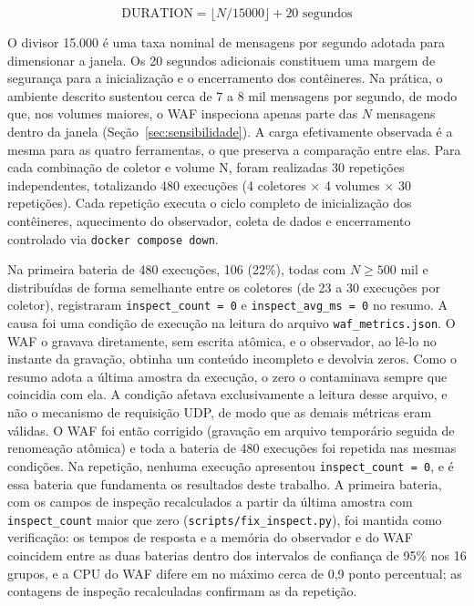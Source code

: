 \begin{equation}
\text{DURATION} = \lfloor N / 15000 \rfloor + 20 \text{ segundos}
\label{eq:duration}
\end{equation}

O divisor 15.000 é uma taxa nominal de mensagens por segundo adotada para dimensionar a janela. Os 20 segundos adicionais constituem uma margem de segurança para a inicialização e o encerramento dos contêineres. Na prática, o ambiente descrito sustentou cerca de 7 a 8 mil mensagens por segundo, de modo que, nos volumes maiores, o WAF inspeciona apenas parte das $N$ mensagens dentro da janela (Seção~\ref{sec:sensibilidade}). A carga efetivamente observada é a mesma para as quatro ferramentas, o que preserva a comparação entre elas. Para cada combinação de coletor e volume N, foram realizadas 30 repetições independentes, totalizando 480 execuções (4 coletores $\times$ 4 volumes $\times$ 30 repetições). Cada repetição executa o ciclo completo de inicialização dos contêineres, aquecimento do observador, coleta de dados e encerramento controlado via \texttt{docker compose down}.

Na primeira bateria de 480 execuções, 106 (22\%), todas com $N \geq 500$ mil e distribuídas de forma semelhante entre os coletores (de 23 a 30 execuções por coletor), registraram \texttt{inspect\_count = 0} e \texttt{inspect\_avg\_ms = 0} no resumo. A causa foi uma condição de execução na leitura do arquivo \texttt{waf\_metrics.json}. O WAF o gravava diretamente, sem escrita atômica, e o observador, ao lê-lo no instante da gravação, obtinha um conteúdo incompleto e devolvia zeros. Como o resumo adota a última amostra da execução, o zero o contaminava sempre que coincidia com ela. A condição afetava exclusivamente a leitura desse arquivo, e não o mecanismo de requisição UDP, de modo que as demais métricas eram válidas. O WAF foi então corrigido (gravação em arquivo temporário seguida de renomeação atômica) e toda a bateria de 480 execuções foi repetida nas mesmas condições. Na repetição, nenhuma execução apresentou \texttt{inspect\_count = 0}, e é essa bateria que fundamenta os resultados deste trabalho. A primeira bateria, com os campos de inspeção recalculados a partir da última amostra com \texttt{inspect\_count} maior que zero (\texttt{scripts/fix\_inspect.py}), foi mantida como verificação: os tempos de resposta e a memória do observador e do WAF coincidem entre as duas baterias dentro dos intervalos de confiança de 95\% nos 16 grupos, e a CPU do WAF difere em no máximo cerca de 0,9 ponto percentual; as contagens de inspeção recalculadas confirmam as da repetição.

